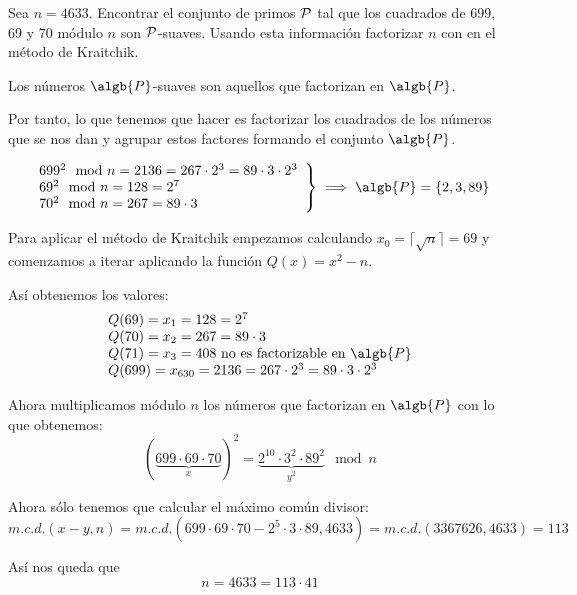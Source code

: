 \begin{problem}[6]
Sea $n=4633$. Encontrar el conjunto de primos $\cal P$ tal que los cuadrados de 699, 69 y 70 m\'odulo $n$ son $\cal P$-suaves. Usando esta informaci\'on factorizar $n$ con en el m\'etodo de Kraitchik.
\solution


Los números $\algb{P}$-suaves son aquellos que factorizan en $\algb{P}$.

Por tanto, lo que tenemos que hacer es factorizar los cuadrados de los números que se nos dan y agrupar estos factores formando el conjunto $\algb{P}$.


\[\left.\begin{array}{l}
699^2 \mod n = 2136 = 267 \cdot 2^3 = 89 \cdot 3 \cdot 2^3 \\
69^2 \mod n = 128 = 2^7 \\
70^2 \mod n = 267 = 89 \cdot 3
\end{array}\right\} \implies \algb{P} = \{ 2,3,89\}\]

Para aplicar el método de Kraitchik empezamos calculando $x_0=\lceil \sqrt{n} \rceil=69$ y comenzamos a iterar aplicando la función $Q(x)=x^2-n$.

Así obtenemos los valores:
\[\begin{array}{l}
Q(69) = x_1 = 128 = 2^{7}\\
Q(70) = x_2 = 267 = 89 \cdot 3  \\
Q(71) = x_3 = 408 \text{ no es factorizable en } \algb{P} \\
Q(699) = x_{630} = 2136 = 267 \cdot 2^3 = 89 \cdot 3 \cdot 2^3
\end{array}\]

Ahora multiplicamos módulo $n$ los números que factorizan en $\algb{P}$ con lo que obtenemos:
\[(\underbrace{699 \cdot 69 \cdot 70}_{x})^2 = \underbrace{2^{10}\cdot 3^2 \cdot 89^2}_{y^2} \mod n\]

Ahora sólo tenemos que calcular el máximo común divisor:
\[m.c.d.(x-y,n)= m.c.d.\left(699 \cdot 69 \cdot 70 - 2^{5}\cdot 3 \cdot 89, 4633\right) = m.c.d.(3367626, 4633) = 113\]

Así nos queda que
\[n = 4633 = 113 \cdot 41\]
\end{problem}

